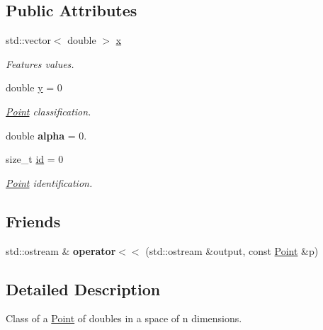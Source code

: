 \subsection*{Public Attributes}
\begin{DoxyCompactItemize}
\item 
\mbox{\label{class_point_a1e22056737f10e31025b353c86e3b9e3}} 
std\+::vector$<$ double $>$ \hyperlink{class_point_a1e22056737f10e31025b353c86e3b9e3}{x}
\begin{DoxyCompactList}\small\item\em Features values. \end{DoxyCompactList}\item 
\mbox{\label{class_point_afa38be143ae800e6ad69ce8ed4df62d8}} 
double \hyperlink{class_point_afa38be143ae800e6ad69ce8ed4df62d8}{y} = 0
\begin{DoxyCompactList}\small\item\em \hyperlink{class_point}{Point} classification. \end{DoxyCompactList}\item 
\mbox{\label{class_point_a8595ba929b962c97293ab35a0c60b434}} 
double {\bfseries alpha} = 0.
\item 
\mbox{\label{class_point_a8448ad503b3aa40f3c9d4b6e3c5a039e}} 
size\+\_\+t \hyperlink{class_point_a8448ad503b3aa40f3c9d4b6e3c5a039e}{id} = 0
\begin{DoxyCompactList}\small\item\em \hyperlink{class_point}{Point} identification. \end{DoxyCompactList}\end{DoxyCompactItemize}
\subsection*{Friends}
\begin{DoxyCompactItemize}
\item 
\mbox{\label{class_point_a18e1e2eb3b3b27719f367688e8611b45}} 
std\+::ostream \& {\bfseries operator$<$$<$} (std\+::ostream \&output, const \hyperlink{class_point}{Point} \&p)
\end{DoxyCompactItemize}


\subsection{Detailed Description}
Class of a \hyperlink{class_point}{Point} of doubles in a space of n dimensions. 

